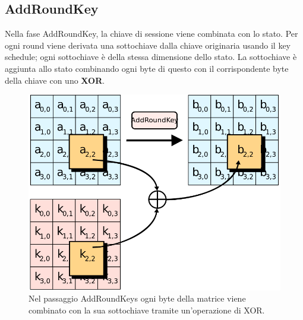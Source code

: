 \subsection{AddRoundKey}
Nella fase AddRoundKey, la chiave di sessione viene combinata con lo stato. Per ogni round viene derivata una sottochiave dalla chiave originaria usando il key schedule; ogni sottochiave è della stessa dimensione dello stato. La sottochiave è aggiunta allo stato combinando ogni byte di questo con il corrispondente byte della chiave con uno \textbf{XOR}. 

\begin{figure}[H]
\centering
\includegraphics[scale=0.3]{img/addroundkey}
\caption{Nel passaggio AddRoundKeys ogni byte della matrice viene combinato con la sua sottochiave tramite un'operazione di XOR.}
\end{figure}


